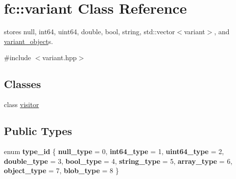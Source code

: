 \hypertarget{classfc_1_1variant}{}\section{fc\+:\+:variant Class Reference}
\label{classfc_1_1variant}


stores null, int64, uint64, double, bool, string, std\+::vector$<$variant$>$, and \mbox{\hyperlink{classfc_1_1variant__object}{variant\+\_\+object}}\textquotesingle{}s.  




{\ttfamily \#include $<$variant.\+hpp$>$}

\subsection*{Classes}
\begin{DoxyCompactItemize}
\item 
class \mbox{\hyperlink{classfc_1_1variant_1_1visitor}{visitor}}
\end{DoxyCompactItemize}
\subsection*{Public Types}
\begin{DoxyCompactItemize}
\item 
\mbox{\label{classfc_1_1variant_a8e472a4f69eccec5336dde2646c69c5f}} 
enum {\bfseries type\+\_\+id} \{ \newline
{\bfseries null\+\_\+type} = 0, 
{\bfseries int64\+\_\+type} = 1, 
{\bfseries uint64\+\_\+type} = 2, 
{\bfseries double\+\_\+type} = 3, 
\newline
{\bfseries bool\+\_\+type} = 4, 
{\bfseries string\+\_\+type} = 5, 
{\bfseries array\+\_\+type} = 6, 
{\bfseries object\+\_\+type} = 7, 
\newline
{\bfseries blob\+\_\+type} = 8
 \}
\end{DoxyCompactItemize}
